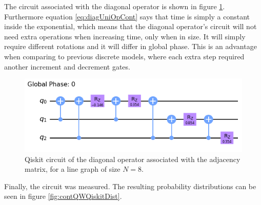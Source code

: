 \documentclass[../../dissertation.tex]{subfiles}
\begin{document}
The circuit associated with the diagonal operator is shown in figure
\ref{fig:diagCircuitQiskit}. Furthermore equation \eqref{eq:diagUniOpCont} says
that time is simply a constant inside the exponential, which means that the
diagonal operator's circuit will not need extra operations when increasing
time, only when in size. It will simply require different rotations and it will differ in global phase.  This
is an advantage when comparing to previous discrete models,  where each extra
step required another increment and decrement gates.
\begin{figure}[!h]
	\centering
	\includegraphics[scale=0.50]{img/Qiskit/ContQuantumWalk/Circuits/circDiag_N3_S1.png}
	\caption{Qiskit circuit of the diagonal operator associated with the adjacency matrix, for a line graph of size $N=8$.}
	\label{fig:diagCircuitQiskit}
\end{figure}\par

Finally, the circuit was measured. The resulting probability distributions
can be seen in figure \ref{fig:contQWQiskitDist}.\par
\end{document}
